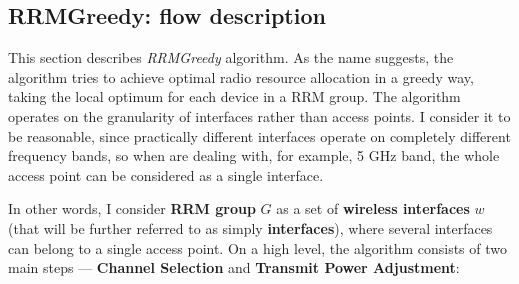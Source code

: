 \subsection{RRMGreedy: flow description}
This section describes \textit{RRMGreedy} algorithm.
As the name suggests, the algorithm tries to achieve optimal radio resource allocation in a greedy way, taking the local optimum for each device in a RRM group.
The algorithm operates on the granularity of interfaces rather than access points. I consider it to be reasonable, since practically different interfaces operate on completely different frequency bands, so when are dealing with, for example, 5 GHz band, the whole access point can be considered as a single interface.

In other words, I consider \textbf{RRM group} $G$ as a set of \textbf{wireless interfaces} $w$ (that will be further referred to as simply \textbf{interfaces}), where several interfaces can belong to a single access point.
On a high level, the algorithm consists of two main steps --- \textbf{Channel Selection} and \textbf{Transmit Power Adjustment}:
\everymath{\displaystyle}

